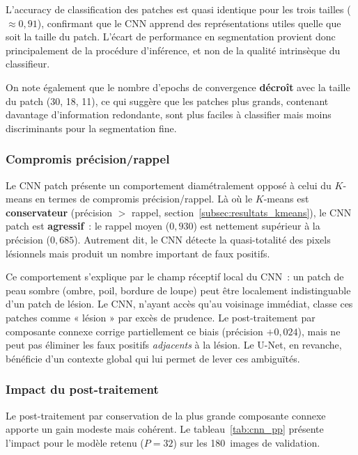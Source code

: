 \documentclass[12pt,a4paper]{article}
\begin{document}
L'accuracy de classification des patches est quasi identique pour les trois tailles ($\approx 0{,}91$), confirmant que le CNN apprend des représentations utiles quelle que soit la taille du patch. L'écart de performance en segmentation provient donc principalement de la procédure d'inférence, et non de la qualité intrinsèque du classifieur.

On note également que le nombre d'epochs de convergence \textbf{décroît} avec la taille du patch (30, 18, 11), ce qui suggère que les patches plus grands, contenant davantage d'information redondante, sont plus faciles à classifier mais moins discriminants pour la segmentation fine.

\subsubsection{Compromis précision/rappel}

Le CNN patch présente un comportement diamétralement opposé à celui du $K$-means en termes de compromis précision/rappel. Là où le $K$-means est \textbf{conservateur} (précision $> $ rappel, section~\ref{subsec:resultats_kmeans}), le CNN patch est \textbf{agressif}~: le rappel moyen ($0{,}930$) est nettement supérieur à la précision ($0{,}685$). Autrement dit, le CNN détecte la quasi-totalité des pixels lésionnels mais produit un nombre important de faux positifs.

Ce comportement s'explique par le champ réceptif local du CNN~: un patch de peau sombre (ombre, poil, bordure de loupe) peut être localement indistinguable d'un patch de lésion. Le CNN, n'ayant accès qu'au voisinage immédiat, classe ces patches comme « lésion » par excès de prudence. Le post-traitement par composante connexe corrige partiellement ce biais (précision $+0{,}024$), mais ne peut pas éliminer les faux positifs \emph{adjacents} à la lésion. Le U-Net, en revanche, bénéficie d'un contexte global qui lui permet de lever ces ambiguïtés.

\subsubsection{Impact du post-traitement}

Le post-traitement par conservation de la plus grande composante connexe apporte un gain modeste mais cohérent. Le tableau~\ref{tab:cnn_pp} présente l'impact pour le modèle retenu ($P = 32$) sur les 180~images de validation.
\end{document}
